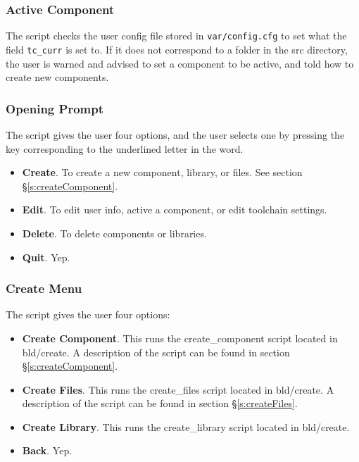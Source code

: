 \documentclass[a4paper, oneside, 11pt, titlepage, onecolumn, openright]{report}
\begin{document}
\subsubsection{Active Component}
			\label{sss:VFstartActiveComponent}
			
			The script checks the user config file stored in \texttt{var/config.cfg} to set what the field \texttt{tc\_curr} is set to. If it does not correspond to a folder in the src directory, the user is warned and advised to set a component to be active, and told how to create new components.
			
\subsubsection{Opening Prompt}
			\label{sss:VFstartOpeningPrompt}
			The script gives the user four options, and the user selects one by pressing the key corresponding to the underlined letter in the word.
\begin{itemize}
\item \textbf{Create}. To create a new component, library, or files. See section \S\ref{s:createComponent}.
\item \textbf{Edit}. To edit user info, active a component, or edit toolchain settings.
\item \textbf{Delete}. To delete components or libraries.
\item \textbf{Quit}. Yep.
\end{itemize}			
			 
			
\subsubsection{Create Menu}
			\label{sss:VFstartCreateMenu}
			The script gives the user four options:
\begin{itemize}
\item \textbf{Create Component}. This runs the create\_component script located in bld/create. A description of the script can be found in section \S\ref{s:createComponent}.
\item \textbf{Create Files}. This runs the create\_files script located in bld/create. A description of the script can be found in section \S\ref{s:createFiles}.
\item \textbf{Create Library}. This runs the create\_library script located in bld/create.
\item \textbf{Back}. Yep.
\end{itemize}				
			
\end{document}
